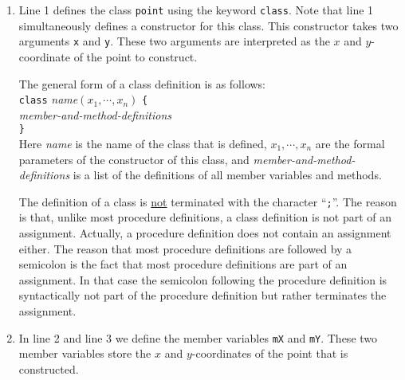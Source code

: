 \begin{enumerate}
\item Line 1 defines the class \texttt{point} using the keyword \texttt{class}.  Note that
      line 1 simultaneously defines a constructor for this class.  This constructor takes two
      arguments \texttt{x} and \texttt{y}.  These two arguments are interpreted as the $x$ and
      $y$-coordinate of the point to construct.

      The general form of a class definition is as follows:
      \\[0.2cm]
      \hspace*{1.3cm}
      \texttt{class} \textsl{name}$(x_1, \cdots, x_n)$ \texttt{\{}  
      \\
      \hspace*{2.0cm} \textsl{member-and-method-definitions}
      \\
      \hspace*{1.3cm}
      \texttt{\}}
      \\[0.2cm]
      Here \textsl{name} is the name of the class that is defined, $x_1, \cdots, x_n$ are the formal
      parameters of the constructor of this class, and \textsl{member-and-method-definitions} is a
      list of the definitions of all member variables and methods.

      The definition of a class is \underline{not} terminated with the character ``\texttt{;}''.
      The reason is that, unlike most procedure definitions, a class definition is not part of an
      assignment.  Actually, a procedure definition does not contain an assignment either.  The
      reason that most procedure definitions are followed by a semicolon is the fact that most
      procedure definitions are part of an assignment.  In that case the semicolon following the procedure
      definition is syntactically not part of the procedure definition but rather terminates the assignment.
\item In line 2 and line 3 we define the member variables \texttt{mX} and \texttt{mY}.  These two
      member variables store the $x$ and $y$-coordinates of the point that is constructed.


\end{enumerate}

